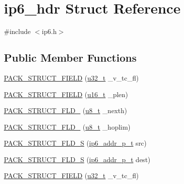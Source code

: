\hypertarget{structip6__hdr}{}\section{ip6\+\_\+hdr Struct Reference}
\label{structip6__hdr}


{\ttfamily \#include $<$ip6.\+h$>$}

\subsection*{Public Member Functions}
\begin{DoxyCompactItemize}
\item 
\hyperlink{structip6__hdr_ac6e6140bc60cc977c547fe1edf51bc66}{P\+A\+C\+K\+\_\+\+S\+T\+R\+U\+C\+T\+\_\+\+F\+I\+E\+LD} (\hyperlink{group__compiler__abstraction_ga4c14294869aceba3ef9d4c0c302d0f33}{u32\+\_\+t} \+\_\+v\+\_\+tc\+\_\+fl)
\item 
\hyperlink{structip6__hdr_a4d64e25829aa166cbec217bcfe82738d}{P\+A\+C\+K\+\_\+\+S\+T\+R\+U\+C\+T\+\_\+\+F\+I\+E\+LD} (\hyperlink{group__compiler__abstraction_ga77570ac4fcab86864fa1916e55676da2}{u16\+\_\+t} \+\_\+plen)
\item 
\hyperlink{structip6__hdr_a7e8821e0eb16fe1f048228c119a69942}{P\+A\+C\+K\+\_\+\+S\+T\+R\+U\+C\+T\+\_\+\+F\+L\+D\+\_} (\hyperlink{group__compiler__abstraction_ga4caecabca98b43919dd11be1c0d4cd8e}{u8\+\_\+t} \+\_\+nexth)
\item 
\hyperlink{structip6__hdr_ac7897fc50f21b379fd95b4acf8e4e7fb}{P\+A\+C\+K\+\_\+\+S\+T\+R\+U\+C\+T\+\_\+\+F\+L\+D\+\_} (\hyperlink{group__compiler__abstraction_ga4caecabca98b43919dd11be1c0d4cd8e}{u8\+\_\+t} \+\_\+hoplim)
\item 
\hyperlink{structip6__hdr_a5a575c55ef0ba5454a4b2930cfc10733}{P\+A\+C\+K\+\_\+\+S\+T\+R\+U\+C\+T\+\_\+\+F\+L\+D\+\_\+S} (\hyperlink{native_2lwip_2src_2include_2lwip_2prot_2ip6_8h_a560932a657f17ec5a0a3a78a1ce7e60a}{ip6\+\_\+addr\+\_\+p\+\_\+t} src)
\item 
\hyperlink{structip6__hdr_a811301a2309cec8d73a5d79fb5d45578}{P\+A\+C\+K\+\_\+\+S\+T\+R\+U\+C\+T\+\_\+\+F\+L\+D\+\_\+S} (\hyperlink{native_2lwip_2src_2include_2lwip_2prot_2ip6_8h_a560932a657f17ec5a0a3a78a1ce7e60a}{ip6\+\_\+addr\+\_\+p\+\_\+t} dest)
\item 
\hyperlink{structip6__hdr_ac6e6140bc60cc977c547fe1edf51bc66}{P\+A\+C\+K\+\_\+\+S\+T\+R\+U\+C\+T\+\_\+\+F\+I\+E\+LD} (\hyperlink{group__compiler__abstraction_ga4c14294869aceba3ef9d4c0c302d0f33}{u32\+\_\+t} \+\_\+v\+\_\+tc\+\_\+fl)

\end{DoxyCompactItemize}
